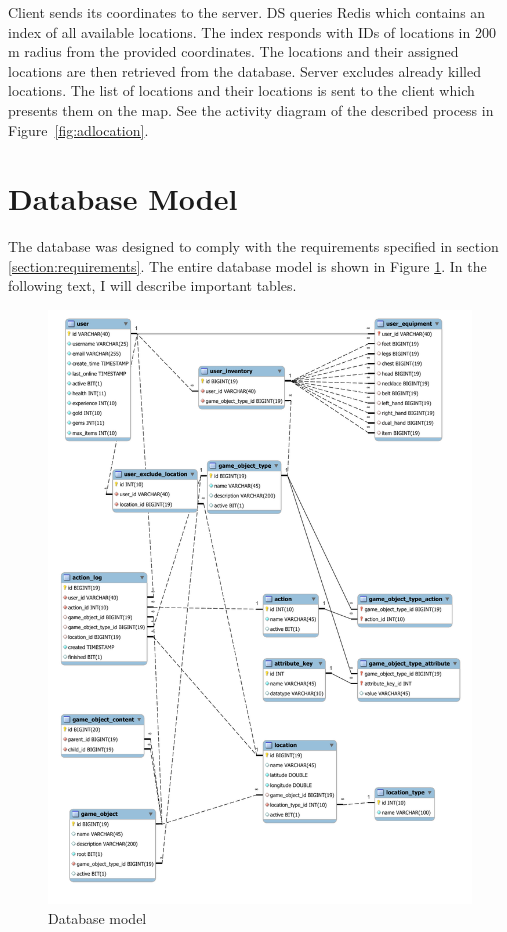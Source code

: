 	Client sends its coordinates to the server. DS queries Redis which contains an index of all available locations. The index responds with IDs of locations in 200 m radius from the provided coordinates. The locations and their assigned locations are then retrieved from the database. Server excludes already killed locations. The list of locations and their locations is sent to the client which presents them on the map. See the activity diagram of the described process in Figure~\ref{fig:adlocation}.		

\section{Database Model}
	The database was designed to comply with the requirements specified in section \ref{section:requirements}. The entire database model is shown in Figure \ref{fig:dbmodel}. In the following text, I will describe important tables.	
	
	\begin{figure}[h]	
		\includegraphics[width=\textwidth]{figures/DatabaseModel}
		\centering
		\caption{Database model}
		\label{fig:dbmodel}	
	\end{figure}
	

